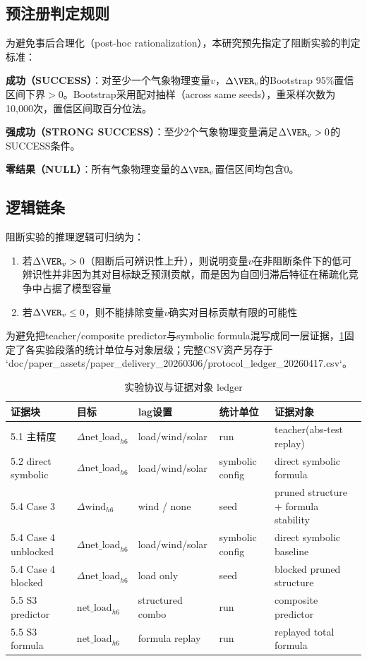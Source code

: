 \subsection{预注册判定规则}

为避免事后合理化（post-hoc rationalization），本研究预先指定了阻断实验的判定标准：

\textbf{成功（SUCCESS）}：对至少一个气象物理变量$v$，$\Delta\VER_v$的Bootstrap 95\%置信区间下界$> 0$。Bootstrap采用配对抽样（across same seeds），重采样次数为10,000次，置信区间取百分位法。

\textbf{强成功（STRONG SUCCESS）}：至少2个气象物理变量满足$\Delta\VER_v > 0$的SUCCESS条件。

\textbf{零结果（NULL）}：所有气象物理变量的$\Delta\VER_v$置信区间均包含0。

\subsection{逻辑链条}

阻断实验的推理逻辑可归纳为：
\begin{enumerate}
  \item 若$\Delta\VER_v > 0$（阻断后可辨识性上升），则说明变量$v$在非阻断条件下的低可辨识性并非因为其对目标缺乏预测贡献，而是因为自回归滞后特征在稀疏化竞争中占据了模型容量
  \item 若$\Delta\VER_v \leq 0$，则不能排除变量$v$确实对目标贡献有限的可能性
\end{enumerate}

为避免把teacher/composite predictor与symbolic formula混写成同一层证据，\cref{tab:protocol-ledger}固定了各实验段落的统计单位与对象层级；完整CSV资产另存于 `doc/paper_assets/paper_delivery_20260306/protocol_ledger_20260417.csv`。

\begin{table}[htbp]
\centering
\caption{实验协议与证据对象 ledger}
\label{tab:protocol-ledger}
\begin{tabularx}{\textwidth}{llllX}
\toprule
证据块 & 目标 & lag设置 & 统计单位 & 证据对象 \\
\midrule
5.1 主精度 & $\Delta\text{net\_load}_{h6}$ & load/wind/solar & run & teacher(abs-test replay) \\
5.2 direct symbolic & $\Delta\text{net\_load}_{h6}$ & load/wind/solar & symbolic config & direct symbolic formula \\
5.4 Case 3 & $\Delta\text{wind}_{h6}$ & wind / none & seed & pruned structure + formula stability \\
5.4 Case 4 unblocked & $\Delta\text{net\_load}_{h6}$ & load/wind/solar & symbolic config & direct symbolic baseline \\
5.4 Case 4 blocked & $\Delta\text{net\_load}_{h6}$ & load only & seed & blocked pruned structure \\
5.5 S3 predictor & $\text{net\_load}_{h6}$ & structured combo & run & composite predictor \\
5.5 S3 formula & $\text{net\_load}_{h6}$ & formula replay & run & replayed total formula \\
\bottomrule
\end{tabularx}
\end{table}

